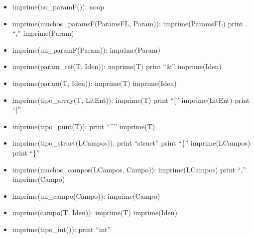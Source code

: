 \documentclass[11pt]{article}
\begin{document}
\begin{itemize}
            \item imprime(no\_paramF()): noop
            
            \item imprime(muchos\_paramsF(ParamsFL, Param)):
                \subitem imprime(ParamsFL)
                \subitem print “,”
                \subitem imprime(Param)
            
            \item imprime(un\_paramF(Param)):
                \subitem imprime(Param)
            
            \item imprime(param\_ref(T, Iden)):
                \subitem imprime(T)
                \subitem print “\&”
                \subitem imprime(Iden)
            
            \item imprime(param(T, Iden)):
                \subitem imprime(T)
                \subitem imprime(Iden)
            
            \item imprime(tipo\_array(T, LitEnt)):
                \subitem imprime(T)
                \subitem print “[”
                \subitem imprime(LitEnt)
                \subitem print “]”
            
            \item imprime(tipo\_punt(T)):
                \subitem print “\^{}”
                \subitem imprime(T)
            
            \item imprime(tipo\_struct(LCampos)):
                \subitem print “struct”
                \subitem print “\{”
                \subitem imprime(LCampos)
                \subitem print “\}”
            
            \item imprime(muchos\_campos(LCampos, Campo)):
                \subitem imprime(LCampos)
                \subitem print “,”
                \subitem imprime(Campo)
            
            \item imprime(un\_campo(Campo)):
                \subitem imprime(Campo)
            
            \item imprime(campo(T, Iden)):
                \subitem imprime(T)
                \subitem imprime(Iden)
            
            \item imprime(tipo\_int()):
                \subitem print “int”
            

\end{itemize}
\end{document}
